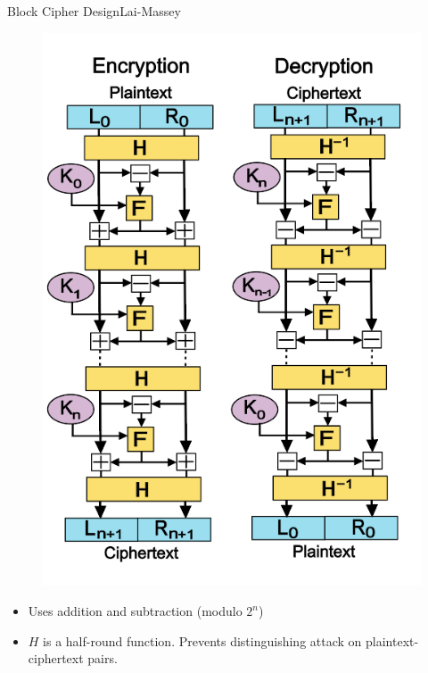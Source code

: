 \documentclass[12pt]{beamer}
\begin{document}
\begin{frame}{Block Cipher Design}{Lai-Massey}
	\centering
	\begin{minipage}{0.45\textwidth}
		\begin{figure}[h!]
			\centering
			\includegraphics[width=\textwidth,height=0.8\textheight,keepaspectratio]{pictures/lai-massey}
		\end{figure}
	\end{minipage}
	\begin{minipage}{0.45\textwidth}
		\begin{itemize}
			\item Uses addition and subtraction (modulo $2^n$)
			\item $H$ is a half-round function. Prevents distinguishing attack
				on plaintext-ciphertext pairs.
		\end{itemize}
	\end{minipage}
\end{frame}
\end{document}
